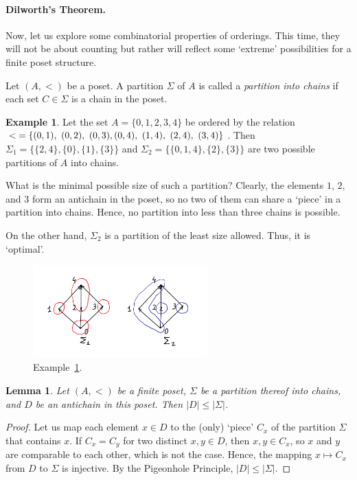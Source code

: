 \documentclass[12pt,notitlepage]{article}
\theoremstyle{plain}
\newtheorem{lemma}[thm]{Lemma}
\theoremstyle{definition}
\newtheorem{exm}[thm]{Example}
\theoremstyle{plain}
\newcommand{\1}{\mathbf{1}}
\newcommand{\0}{\mathbf{0}}
\begin{document}
\paragraph{Dilworth's Theorem.} Now, let us explore some combinatorial properties of orderings. This time, they will not be about counting but rather will reflect some `extreme' possibilities for a finite poset structure.

Let $(A, <)$ be a poset. A partition $\Sigma$ of $A$ is called a \emph{partition into chains} if each set $C \in \Sigma$ is a chain in the poset.

\begin{exm}\label{dilworth_exm}
Let the set $A = \{0, 1, 2, 3, 4\}$ be ordered by the relation ${<} = \{(0, 1),\ (0, 2),\ (0, 3),\linebreak (0, 4),\ (1,4),\ (2, 4),\ (3, 4)\}$. Then $\Sigma_1 = \{ \{2, 4\}, \{0\}, \{1\}, \{3\} \}$ and $\Sigma_2 = \{ \{0, 1 , 4\}, \{2\}, \{3\} \}$ are two possible partitions of $A$ into chains.

What is the minimal possible size of such a partition? Clearly, the elements $1$, $2$, and $3$ form an antichain in the poset, so no two of them can share a `piece' in a partition into chains. Hence, no partition into less than three chains is possible.

On the other hand, $\Sigma_2$ is a partition of the least size allowed. Thus, it is `optimal'.
\end{exm}

\begin{figure}[h]
\centering
\includegraphics*[width=0.6\textwidth]{dilworth_exm.pdf}
\caption{Example~\ref{dilworth_exm}.}
\end{figure}


\begin{lemma}\label{L13:dilw_triv}
Let $(A, <)$ be a finite poset, $\Sigma$ be a partition thereof into chains, and $D$ be an antichain in this poset. Then $|D| \leq |\Sigma|$.
\end{lemma}
\begin{proof}
Let us map each element $x \in D$ to the (only) `piece' $C_x$ of the partition $\Sigma$ that contains $x$. If $C_x = C_y$ for two distinct $x, y \in D$, then $x, y \in C_x$, so $x$ and $y$ are comparable to each other, which is not the case. Hence, the mapping $x \mapsto C_x$ from $D$ to $\Sigma$ is injective. By the Pigeonhole Principle, $|D| \leq |\Sigma|$.
\end{proof}
\end{document}
